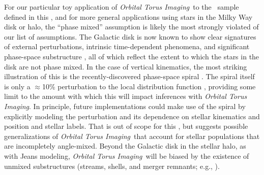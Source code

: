 \documentclass[modern]{aastex63}
\newcommand{\methodname}{\textsl{Orbital Torus Imaging}}
\newcommand{\apogee}{\acronym{APOGEE}}
\begin{document}
For our particular toy application of \methodname\ to the \apogee\ sample
defined in this \documentname, and for more general applications using stars in
the Milky Way disk or halo, the ``phase mixed'' assumption is likely the most
strongly violated of our list of assumptions.
The Galactic disk is now known to show clear signatures of external
perturbations, intrinsic time-dependent phenomena, and significant phase-space
substructure \citep[e.g.,][]{Antoja:2018, Schonrich:2018, Hunt:2018,
Kamdar:2019, Monari:2019, Khanna:2019, Poggio:2020, Laporte:2020,
Coronado:2020}, all of which reflect the extent to which the stars in the disk
are not phase mixed.
In the case of vertical kinematics, the most striking illustration of this is
the recently-discovered phase-space spiral \citep{Antoja:2018}.
The spiral itself is only a $\approx$10\% perturbation to the local distribution
function \citep{Laporte:2019}, providing some limit to the amount with which
this will impact inferences with \methodname.
In principle, future implementations could make use of the spiral by explicitly
modeling the perturbation and its dependence on stellar kinematics and position
and stellar labels.
That is out of scope for this \documentname, but suggests possible
generalizations of \methodname\ that account for stellar populations that are
incompletely angle-mixed.
Beyond the Galactic disk in the stellar halo, as with Jeans modeling,
\methodname\ will be biased by the existence of unmixed substructures (streams,
shells, and merger remnants; e.g., \citealt{Grillmair:2016, Shipp:2018}).

\end{document}
